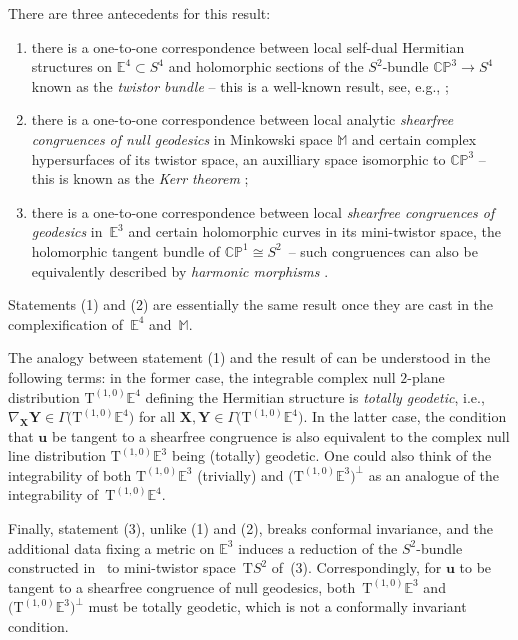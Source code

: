 \documentclass[10pt,a4paper]{amsart}
\numberwithin{equation}{section}
\newcommand{\Tgt} {\mathrm{T}}
\newcommand{\E} {\mathbb{E}}
\newcommand{\M} {\mathbb{M}}
\newcommand{\CP} {\mathbb{CP}}
\begin{document}
There are three antecedents for this result:
\begin{enumerate}\itemsep=0pt
\item[1)] %
there is a one-to-one correspondence between local self-dual Hermitian structures on \mbox{$\E^4 {\subset} S^4$} and holomorphic sections of the $S^2$-bundle $\CP^3 \rightarrow S^4$ known as the \emph{twistor bundle} -- this is a well-known result, see, e.g., \cite{Baird2013,Baird2003, Eells1985,Hughston1988,Salamon2009};
\item[2)] %
there is a one-to-one correspondence between local analytic \emph{shearfree congruences of null geodesics} in Minkowski space $\M$ and certain complex hypersurfaces of its twistor space, an auxilliary space isomorphic to $\CP^3$ -- this is known as the \emph{Kerr theorem} \cite{Cox1976,Penrose1967,Penrose1986};
\item[3)] %
there is a one-to-one correspondence between local \emph{shearfree congruences of geodesics} in~$\E^3$ and certain holomorphic curves in its mini-twistor space, the holomorphic tangent bundle of $\CP^1 \cong S^2$~-- such congruences can also be equivalently described by \emph{harmonic morphisms} \cite{Baird1988,Tod1995,Tod1995a}.
\end{enumerate}
Statements (1) and (2) are essentially the same result once they are cast in the complexif\/ication of~$\E^4$ and~$\M$.

The analogy between statement (1) and the result of \cite{Baird2013} can be understood in the following terms: in the former case, the integrable complex null $2$-plane distribution $\Tgt^{(1,0)} \E^4$ def\/ining the Hermitian structure is \emph{totally geodetic}, i.e., $\nabla_{\bm{X}} \bm{Y} \in \Gamma \big(\Tgt^{(1,0)} \E^4\big)$ for all $\bm{X},\bm{Y} \in \Gamma \big(\Tgt^{(1,0)} \E^4\big)$. In the latter case, the condition that $\bm{u}$ be tangent to a shearfree congruence is also equivalent to the complex null line distribution $\Tgt^{(1,0)} \E^3$ being (totally) geodetic. One could also think of the integrability of both $\Tgt^{(1,0)} \E^3$ (trivially) and $\big(\Tgt^{(1,0)} \E^3\big)^\perp$ as an analogue of the integrability of~$\Tgt^{(1,0)} \E^4$.

 Finally, statement (3), unlike (1) and (2), breaks conformal invariance, and the additional data f\/ixing a metric on $\E^3$ induces a reduction of the $S^2$-bundle constructed in~\cite{Baird2013} to mini-twistor space~$\Tgt S^2$ of~(3). Correspondingly, for $\bm{u}$ to be tangent to a shearfree congruence of null geodesics, both~$\Tgt^{(1,0)} \E^3$ and $\big(\Tgt^{(1,0)} \E^3\big)^\perp$ must be totally geodetic, which is not a conformally invariant condition.
\end{document}
